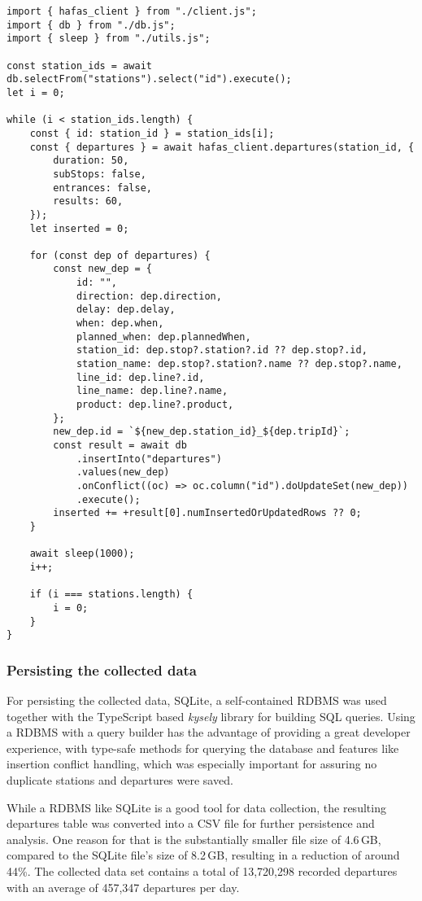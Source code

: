 \begin{lstlisting}[caption={A \texttt{departure} object returned by the \ac{HAFAS} \ac{API}}, label={code:monitor}]
import { hafas_client } from "./client.js";
import { db } from "./db.js";
import { sleep } from "./utils.js";

const station_ids = await db.selectFrom("stations").select("id").execute();
let i = 0;

while (i < station_ids.length) {
	const { id: station_id } = station_ids[i];
	const { departures } = await hafas_client.departures(station_id, {
		duration: 50,
		subStops: false,
		entrances: false,
		results: 60,
	});
	let inserted = 0;

	for (const dep of departures) {
		const new_dep = {
			id: "",
			direction: dep.direction,
			delay: dep.delay,
			when: dep.when,
			planned_when: dep.plannedWhen,
			station_id: dep.stop?.station?.id ?? dep.stop?.id,
			station_name: dep.stop?.station?.name ?? dep.stop?.name,
			line_id: dep.line?.id,
			line_name: dep.line?.name,
			product: dep.line?.product,
		};
		new_dep.id = `${new_dep.station_id}_${dep.tripId}`;
		const result = await db
			.insertInto("departures")
			.values(new_dep)
			.onConflict((oc) => oc.column("id").doUpdateSet(new_dep))
			.execute();
		inserted += +result[0].numInsertedOrUpdatedRows ?? 0;
	}

	await sleep(1000);
	i++;

	if (i === stations.length) {
		i = 0;
	}
}
\end{lstlisting}

\subsubsection{Persisting the collected data}
\label{sec:persisting}

For persisting the collected data, SQLite, a self-contained \ac{RDBMS} was used together with the TypeScript based \textit{kysely} library for building \ac{SQL} queries. Using a \ac{RDBMS} with a query builder has the advantage of providing a great developer experience, with type-safe methods for querying the database and features like insertion conflict handling, which was especially important for assuring no duplicate stations and departures were saved.

While a \ac{RDBMS} like SQLite is a good tool for data collection, the resulting departures table was converted into a \ac{CSV} file for further persistence and analysis. One reason for that is the substantially smaller file size of 4.6\,GB, compared to the SQLite file's size of 8.2\,GB, resulting in a reduction of around 44\%. The collected data set contains a total of 13,720,298 recorded departures with an average of 457,347 departures per day.